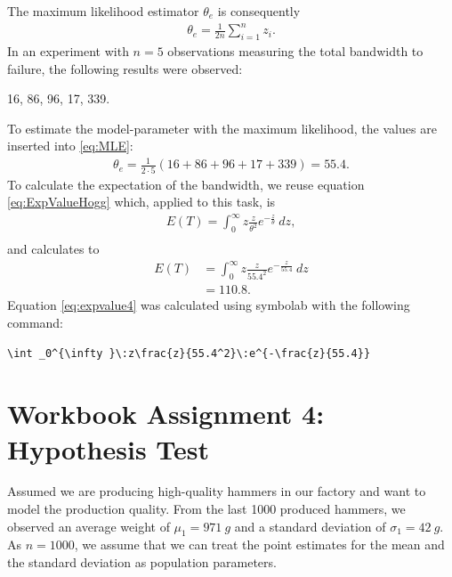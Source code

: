 The maximum likelihood estimator $\theta_e$ is consequently 
\begin{equation}
\begin{split}
\theta_e =\frac{1}{2n}\sum_{i=1}^n z_i.
\end{split}
\label{eq:MLE}
\end{equation}
In an experiment with $n=5$ observations measuring the total bandwidth to failure, the following results were observed:
\begin{center}
16, 86, 96, 17, 339.
\end{center}
To estimate the model-parameter with the maximum likelihood, the values are inserted into \eqref{eq:MLE}:
\begin{equation}
\begin{split}
\theta_e =\frac{1}{2\cdot5}(16+86+96+17+339) = 55.4.
\end{split}
\label{eq:MLECalculation}
\end{equation}
To calculate the expectation of the bandwidth, we reuse equation \eqref{eq:ExpValueHogg} which, applied to this task, is
\begin{equation}
\begin{split}
E(T) = \int_0^\infty z\frac{z}{\theta^2} e^{-\frac{z}{\theta}}~dz,\\
\end{split}
\label{eq:expvalue3}
\end{equation}
and calculates to 
\begin{equation}
\begin{split}
E(T) 
&= \int_0^\infty z\frac{z}{55.4^2} e^{-\frac{z}{55.4}}~dz\\
&= 110.8.
\end{split}
\label{eq:expvalue4}
\end{equation}
Equation \eqref{eq:expvalue4} was calculated using symbolab \cite{symbolab} with the following command:
\begin{lstlisting}
\int _0^{\infty }\:z\frac{z}{55.4^2}\:e^{-\frac{z}{55.4}}
\end{lstlisting}

\chapter{Workbook Assignment 4: Hypothesis Test}	

Assumed we are producing high-quality hammers in our factory and want to model the production quality. From the last 1000 produced hammers, we observed an average weight of $\mu_1=971~g$ and a standard deviation of $\sigma_1 = 42~g$. As $n = 1000$, we assume that we can treat the point estimates for the mean and the standard deviation as population parameters.

